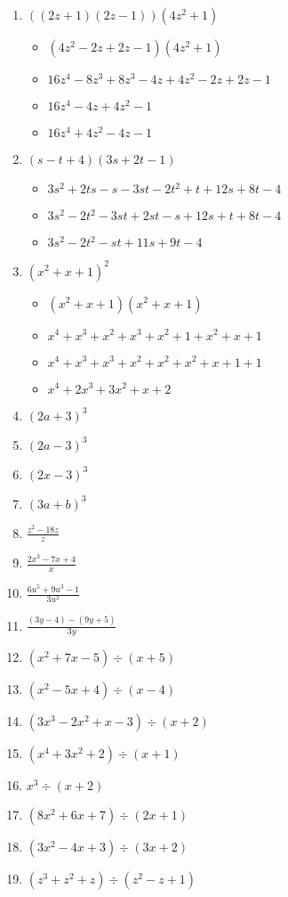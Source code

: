 \documentclass{article}
\begin{document}
\begin{onehalfspace}
\begin{enumerate}
    \item $((2z + 1)(2z - 1))(4z^{2} + 1)$
    \begin{itemize}
        \item $(4z^{2} - 2z + 2z - 1)(4z^{2} + 1)$
        \item $16z^{4} - 8z^{3} + 8z^{3} - 4z + 4z^{2} - 2z + 2z - 1$
        \item $16z^{4} - 4z + 4z^{2} - 1$
        \item $16z^{4} + 4z^{2} - 4z - 1$
    \end{itemize}

    \item $(s - t + 4)(3s + 2t - 1)$
    \begin{itemize}
        \item $3s^{2} + 2ts - s - 3st - 2t^{2} + t + 12s + 8t - 4$
        \item $3s^{2} - 2t^{2} - 3st + 2st - s + 12s + t + 8t - 4$
        \item $3s^{2} - 2t^{2} - st + 11s + 9t - 4$
    \end{itemize}
    \item $(x^{2} + x + 1)^{2}$
    \begin{itemize}
        \item $(x^{2} + x + 1)(x^{2} + x + 1)$
        \item $x^{4} + x^{3} + x^{2} + x^{3} + x^{2} + 1 + x^{2} + x + 1$
        \item $x^{4} + x^{3} + x^{3} + x^{2} + x^{2} + x^{2} + x + 1 + 1$
        \item $x^{4} + 2x^{3} + 3x^{2} + x + 2$
    \end{itemize}
    
    \item $(2a + 3)^{3}$
    \item $(2a - 3)^{3}$
    \item $(2x - 3)^{3}$
    \item $(3a + b)^{3}$
    \item $\frac{z^{2} - 18z}{z}$
    \item $\frac{2x^{3} - 7x + 4}{x}$
    \item $\frac{6u^{5} + 9u^{3} - 1}{3u^{2}}$
    \item $\frac{(3y - 4) - (9y + 5)}{3y}$
    \item $(x^{2} + 7x - 5) \div (x + 5)$
    \item $(x^{2} - 5x + 4) \div (x - 4)$
    \item $(3x^{3} - 2x^{2} + x - 3) \div (x + 2)$
    \item $(x^{4} + 3x^{2} + 2) \div (x + 1)$
    \item $x^{3} \div (x + 2)$
    \item $(8x^{2} + 6x + 7) \div (2x + 1)$
    \item $(3x^{2} - 4x + 3) \div (3x + 2)$
    \item $(z^{3}+ z^{2} + z) \div (z^{2} - z + 1)$
\end{enumerate}
\end{onehalfspace}
\end{document}
